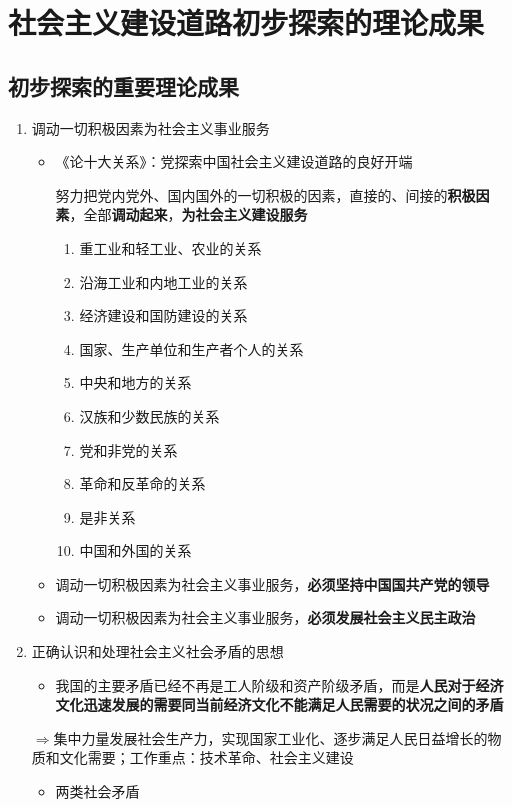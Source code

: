 \documentclass[12pt,openany]{ctexbook}
\begin{document}
\chapter{社会主义建设道路初步探索的理论成果}
\section{初步探索的重要理论成果}
\begin{enumerate}
  \item 调动一切积极因素为社会主义事业服务
\begin{itemize}
  \item 《论十大关系》：党探索中国社会主义建设道路的良好开端
  \par 努力把党内党外、国内国外的一切积极的因素，直接的、间接的\textbf{积极因素}，全部\textbf{调动起来}，\textbf{为社会主义建设服务}
\begin{enumerate}
  \item 重工业和轻工业、农业的关系
  \item 沿海工业和内地工业的关系
  \item 经济建设和国防建设的关系
  \item 国家、生产单位和生产者个人的关系
  \item 中央和地方的关系
  \item 汉族和少数民族的关系
  \item 党和非党的关系
  \item 革命和反革命的关系
  \item 是非关系
  \item 中国和外国的关系
\end{enumerate}
  \item 调动一切积极因素为社会主义事业服务，\textbf{必须坚持中国国共产党的领导}
  \item 调动一切积极因素为社会主义事业服务，\textbf{必须发展社会主义民主政治}
\end{itemize}
  \item 正确认识和处理社会主义社会矛盾的思想
\begin{itemize}
  \item 我国的主要矛盾已经不再是工人阶级和资产阶级矛盾，而是\textbf{人民对于经济文化迅速发展的需要同当前经济文化不能满足人民需要的状况之间的矛盾}
\end{itemize}
  \par $\Longrightarrow$集中力量发展社会生产力，实现国家工业化、逐步满足人民日益增长的物质和文化需要；工作重点：技术革命、社会主义建设
\begin{itemize}
  \item 两类社会矛盾

\end{itemize}
\end{enumerate}
\end{document}
